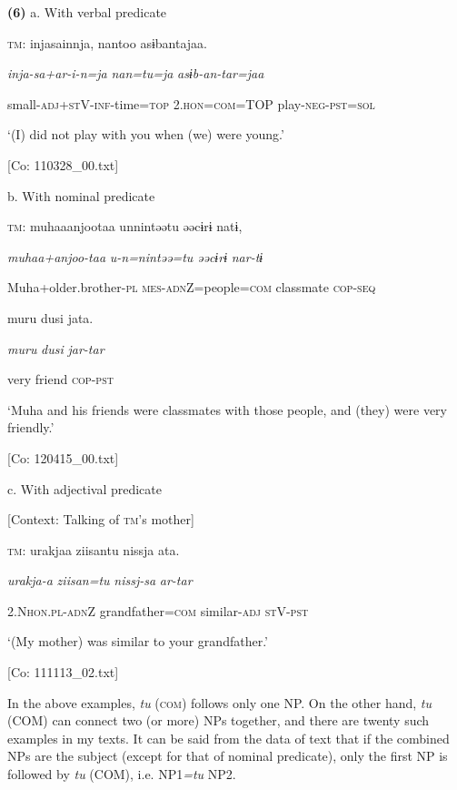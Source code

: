 \textbf{(6)}  a.  With verbal predicate

    \textsc{tm}:  injasainnja,  nantoo  asɨbantajaa.

      \textit{inja-sa+ar-i-n=ja}  \textit{nan=tu=ja}  \textit{asɨb-an-tar=jaa}

      small-\textsc{adj}+\textsc{st}V-\textsc{inf}-time=\textsc{top}  2.\textsc{hon}=\textsc{com}=TOP  play-\textsc{neg}-\textsc{pst}=\textsc{sol}

      ‘(I) did not play with you when (we) were young.’

      [Co: 110328\_00.txt]

  b.  With nominal predicate

    \textsc{tm}:  muhaaanjootaa  unnintəətu  əəcɨrɨ  natɨ,

      \textit{muhaa+anjoo-taa}  \textit{u-n=nintəə=tu}  \textit{əəcɨrɨ}  \textit{nar-tɨ}

      Muha+older.brother-\textsc{pl}  \textsc{mes}-\textsc{adn}Z=people=\textsc{com}  classmate  \textsc{cop}-\textsc{seq}

      muru  dusi  jata.

      \textit{muru}  \textit{dusi}  \textit{jar-tar}

      very  friend  \textsc{cop}-\textsc{pst}

      ‘Muha and his friends were classmates with those people, and (they) were very friendly.’

      [Co: 120415\_00.txt]

  c.  With adjectival predicate

    [Context: Talking of \textsc{tm}’s mother]

    \textsc{tm}:  urakjaa  ziisantu  nissja  ata.

      \textit{urakja-a}  \textit{ziisan=tu}  \textit{nissj-sa}  \textit{ar-tar}

      2.N\textsc{hon}.\textsc{pl}-\textsc{adn}Z  grandfather=\textsc{com}  similar-\textsc{adj}  \textsc{st}V-\textsc{pst}

      ‘(My mother) was similar to your grandfather.’

      [Co: 111113\_02.txt]

In the above examples, \textit{tu} (\textsc{com}) follows only one NP. On the other hand, \textit{tu} (COM) can connect two (or more) NPs together, and there are twenty such examples in my texts. It can be said from the data of text that if the combined NPs are the subject (except for that of nominal predicate), only the first NP is followed by \textit{tu} (COM), i.e. NP1\textit{=tu} NP2.

